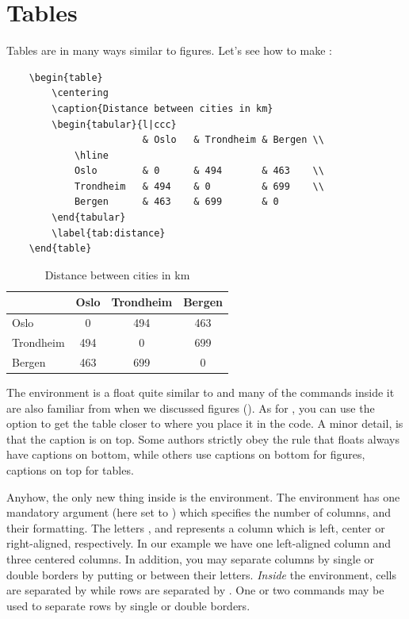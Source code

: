 {\section{Tables}
Tables are in many ways similar to figures. Let's see how to make :

\begin{verbatim}
	\begin{table}
		\centering
		\caption{Distance between cities in km}
		\begin{tabular}{l|ccc}
			            & Oslo   & Trondheim & Bergen \\
			\hline
			Oslo        & 0      & 494       & 463    \\
			Trondheim   & 494    & 0         & 699    \\
			Bergen      & 463    & 699       & 0
		\end{tabular}
		\label{tab:distance}
	\end{table}
\end{verbatim}

\begin{table}
	\centering
	\caption{Distance between cities in km}
	\begin{tabular}{l|ccc}
					& Oslo	& Trondheim	& Bergen		\\
		\hline
		Oslo			& 0		& 494		& 463		\\
		Trondheim	& 494	& 0			& 699		\\
		Bergen		& 463	& 699		& 0
	\end{tabular}
	\label{tab:latex:distance}
\end{table}

The  environment is a float quite similar to  and many of the commands inside it are also familiar from when we discussed figures (). As for , you can use the  option to get the table closer to where you place it in the code. A minor detail, is that the caption is on top. Some authors strictly obey the rule that floats always have captions on bottom, while others use captions on bottom for figures, captions on top for tables.

Anyhow, the only new thing inside  is the  environment. The  environment has one mandatory argument (here set to ) which specifies the number of columns, and their formatting. The letters ,  and  represents a column which is left, center or right-aligned, respectively. In our example we have one left-aligned column and three centered columns. In addition, you may separate columns by single or double borders by putting \latexin{|} or \latexin{||} between their letters. \emph{Inside} the  environment, cells are separated by \latexin{&} while rows are separated by \latexin{\\}. One or two \latexin{\hline} commands may be used to separate rows by single or double borders.

}
